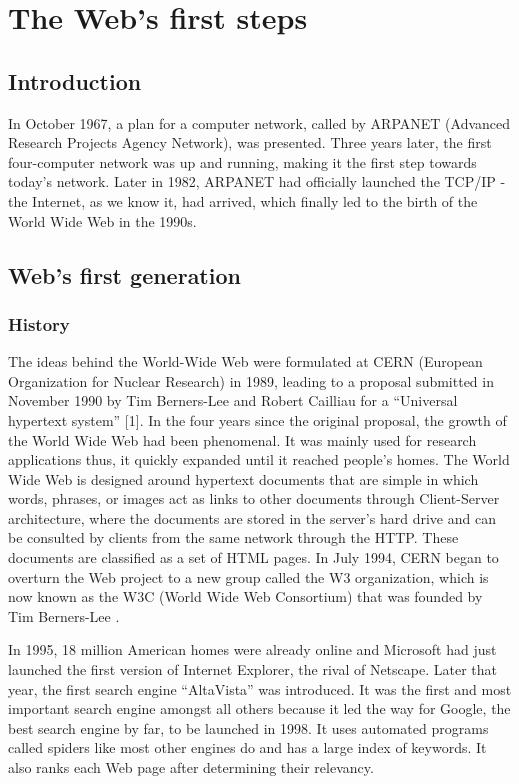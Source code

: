 \chapter{The Web's first steps}
\label{chap_one}

\section*{Introduction}
In October 1967, a plan for a computer network, called by ARPANET (Advanced Research Projects Agency Network)\cite{history}, was presented. Three years later, the first four-computer network was up and running, making it the first step towards today's network. Later in 1982, ARPANET had officially launched the TCP/IP - the Internet, as we know it, had arrived, which finally led to the birth of the World Wide Web in the 1990s. 
\newpage


\section{Web's first generation}
\label{sec_web}
 
\subsection{History}
\label{subsec_history}
The ideas behind the World-Wide Web were formulated at CERN (European Organization for Nuclear Research) in 1989, leading to a proposal submitted in November 1990 by Tim Berners-Lee and Robert Cailliau for a “Universal hypertext system” [1]. In the four years since the original proposal, the growth of the World Wide Web had been phenomenal. It was mainly used for research applications thus, it quickly expanded until it reached people’s homes.
The World Wide Web is designed around hypertext documents that are simple in which words, phrases, or images act as links to other documents through Client-Server architecture, where the documents are stored in the server’s hard drive and can be consulted by clients from the same network through the HTTP. These documents are classified as a set of HTML pages.
In July 1994, CERN began to overturn the Web project to a new group called the W3 organization, which is now known as the W3C (World Wide Web Consortium) that was founded by Tim Berners-Lee  \cite{hist}.

In 1995, 18 million American homes were already online and Microsoft had just launched the first version of Internet Explorer, the rival of Netscape. Later that year, the first search engine “AltaVista” was introduced. It was the first and most important search engine amongst all others because it led the way for Google, the best search engine by far, to be launched in 1998. It uses automated programs called spiders like most other engines do and has a large index of keywords. It also ranks each Web page after determining their relevancy.


